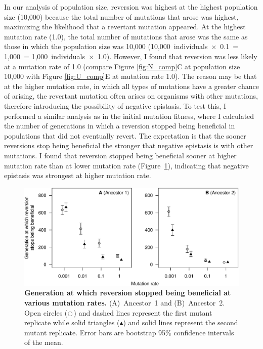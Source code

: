 \begin{doublespace}
In our analysis of population size, reversion was highest
at the highest population size (10,000) because
the total number of mutations that arose was highest,
maximizing the likelihood that a revertant mutation appeared.
%
At the highest mutation rate (1.0),
the total number of mutations that arose was the same
as those in which the population size was 10,000
(10,000~individuals~$\times$~0.1~= 1,000~= 1,000~individuals~$\times$~1.0).
%
However, I found that reversion was less likely at a mutation rate of 1.0
(compare Figure \ref{fig:N_comp}C at population size 10,000
with Figure \ref{fig:U_comp}E at mutation rate 1.0).
%
The reason may be that at the higher mutation rate,
in which all types of mutations have a greater chance of arising,
the revertant mutation often arises on organisms with other mutations,
therefore introducing the possibility of negative epistasis.
%
To test this, I performed a similar analysis as in the initial mutation
fitness, where I calculated the number of generations in which a reversion
stopped being beneficial in populations that did not eventually revert.
%
The expectation is that the sooner reversions stop being beneficial
the stronger that negative epistasis is with other mutations.
%
I found that reversion stopped being beneficial sooner
at higher mutation rate than at lower mutation rate
(Figure~\ref{fig:first-update-rev-bad-U}),
indicating that negative epistasis was strongest at higher mutation rate.



\begin{figure}[b!]
\begin{center}
\includegraphics[width=\linewidth]{first-update-rev-bad-U.pdf}
\end{center}
\caption{
  {\bf Generation at which reversion stopped being beneficial
  at various mutation rates.}
  (A)~Ancestor~1 and (B)~Ancestor~2.
  Open circles ($\ocircle$) and dashed lines
  represent the first mutant replicate
  while solid triangles ($\blacktriangle$) and solid lines
  represent the second mutant replicate.
  Error bars are bootstrap 95\% confidence intervals of the mean.}
\label{fig:first-update-rev-bad-U}
\end{figure}




\end{doublespace}
